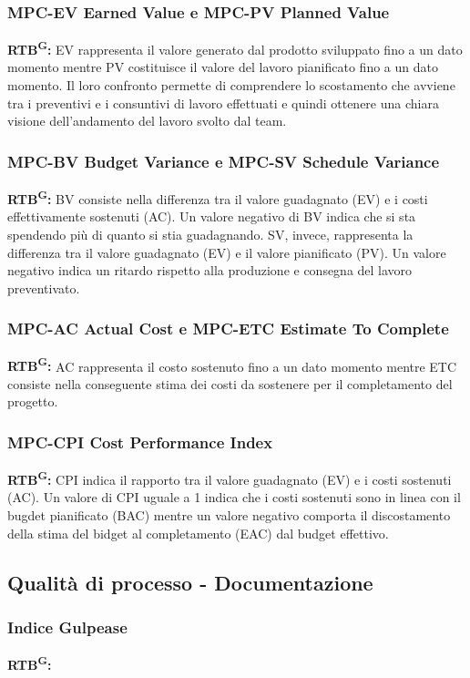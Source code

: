 \documentclass[8pt]{article}
\newcommand{\glossterm}[1]{#1\textsuperscript{G}} %
\begin{document}
\subsubsection{MPC-EV Earned Value e MPC-PV Planned Value}
\textbf{\glossterm{RTB}:} EV rappresenta il valore generato dal prodotto sviluppato fino a un dato momento mentre PV costituisce il valore del lavoro pianificato fino a un dato momento. Il loro confronto permette di comprendere lo scostamento che avviene tra i preventivi e i consuntivi di lavoro effettuati e quindi ottenere una chiara visione dell'andamento del lavoro svolto dal team. 
\subsubsection{MPC-BV Budget Variance e MPC-SV Schedule Variance}
\textbf{\glossterm{RTB}:} BV consiste nella differenza tra il valore guadagnato (EV) e i costi effettivamente sostenuti (AC). Un valore negativo di BV indica che si sta spendendo più di quanto si stia guadagnando. SV, invece, rappresenta la differenza tra il valore guadagnato (EV) e il valore pianificato (PV). Un valore negativo indica un ritardo rispetto alla produzione e consegna del lavoro preventivato.
\subsubsection{MPC-AC Actual Cost e MPC-ETC Estimate To Complete}
\textbf{\glossterm{RTB}:} AC rappresenta il costo sostenuto fino a un dato momento mentre ETC consiste nella conseguente stima dei costi da sostenere per il completamento del progetto.
\subsubsection{MPC-CPI Cost Performance Index}
\textbf{\glossterm{RTB}:} CPI indica il rapporto tra il valore guadagnato (EV) e i costi sostenuti (AC). Un valore di CPI uguale a 1 indica che i costi sostenuti sono in linea con il bugdet pianificato (BAC) mentre un valore negativo comporta il discostamento della stima del bidget al completamento (EAC) dal budget effettivo. 
\subsection{Qualità di processo - Documentazione}
\subsubsection{Indice Gulpease}
\textbf{\glossterm{RTB}:}
\end{document}

